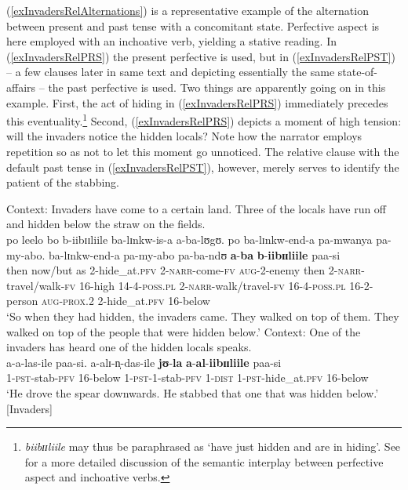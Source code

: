 (\ref{exInvadersRelAlternations}) is a representative example of the alternation between present and past tense with a concomitant state. Perfective aspect is here employed with an inchoative verb, yielding a stative reading. In (\ref{exInvadersRelPRS}) the present perfective is used, but in (\ref{exInvadersRelPST}) -- a few clauses later in same text and depicting essentially the same state-of-affairs -- the past perfective is used. Two things are apparently going on in this example. First, the act of hiding in (\ref{exInvadersRelPRS}) immediately precedes this eventuality.\footnote{\textit{biibɪɪliile} may thus be paraphrased as \lq have just hidden and are in hiding'. See  for a more detailed discussion of the semantic interplay between perfective aspect and inchoative verbs.} Second, (\ref{exInvadersRelPRS}) depicts a moment of high tension: will the invaders notice the hidden locals? Note how the narrator employs repetition so as not to let this moment go unnoticed. The relative clause with the default past tense in (\ref{exInvadersRelPST}), however, merely serves to identify the patient of the stabbing.

\begin{exe}
\ex \label{exInvadersRelAlternations}\begin{xlist}
\ex Context: Invaders have come to a certain land. Three of the locals have run off and hidden below the straw on the fields.\label{exInvadersRelPRS}\\
\gll po leelo bo b-iibɪɪliile ba-lɪnkw-is-a a-ba-lʊgʊ. po ba-lɪnkw-end-a pa-mwanya pa-my-abo. ba-lɪnkw-end-a pa-my-abo pa-ba-ndʊ \textbf{a}-\textbf{ba} \textbf{b}-\textbf{iibɪɪliile} paa-si\\ %
then now/but as 2-hide\_at.\textsc{pfv} 2-\textsc{narr}-come-\textsc{fv} \textsc{aug}-2-enemy then 2-\textsc{narr}-travel/walk-\textsc{fv} 16-high 14-4-\textsc{poss.pl} 2-\textsc{narr}-walk/travel-\textsc{fv} 16-4-\textsc{poss.pl} 16-2-person \textsc{aug}-\textsc{prox.2} 2-hide\_at.\textsc{pfv} 16-below\\
\glt \lq ‎‎So when they had hidden, the invaders came. They walked on top of them. They walked on top of the people that were hidden below.'
\ex Context: One of the invaders has heard one of the hidden locals speaks.\\
\label{exInvadersRelPST} \gll a-a-las-ile paa-si. a-alɪ-n̩-das-ile \textbf{jʊ}-\textbf{la} \textbf{a}-\textbf{al}-\textbf{iibɪɪliile} paa-si\\
1-\textsc{pst}-stab-\textsc{pfv} 16-below 1-\textsc{pst}-1-stab-\textsc{pfv} 1-\textsc{dist} 1-\textsc{pst}-hide\_at.\textsc{pfv} 16-below\\
\glt \lq He drove the spear downwards. He stabbed that one that was hidden below.' [Invaders]
\end{xlist}
\end{exe}

